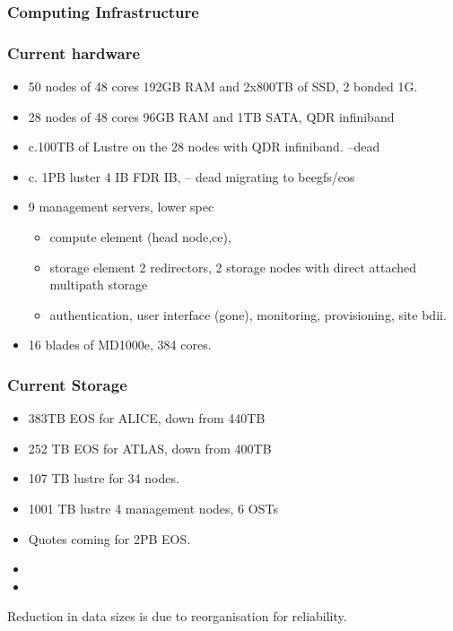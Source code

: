 \documentclass{beamer}
\begin{document}
\begin{frame}
  \frametitle{Computing Infrastructure}
\end{frame}

\begin{frame}
  \frametitle{Current hardware}
  \begin{itemize}
    \item 50 nodes of 48 cores 192GB RAM and 2x800TB of SSD, 2 bonded 1G.
    \item 28 nodes of 48 cores 96GB RAM and 1TB SATA, QDR infiniband
    \item c.100TB of Lustre on the 28 nodes with QDR infiniband. --dead
    \item c. 1PB luster 4 IB FDR IB, -- dead migrating to beegfs/eos
    \item 9 management servers, lower spec
  \begin{itemize}
    \item compute element (head node,ce),
    \item storage element 2 redirectors, 2 storage nodes with direct attached multipath storage
    \item authentication, user interface (gone), monitoring, provisioning, site bdii.
  \end{itemize} 
    \item 16 blades of MD1000e, 384 cores. \color{red}{\bf IB connection}
  \end{itemize}
\end{frame}

\begin{frame}
  \frametitle{Current Storage}
  \begin{itemize}
    \item 383TB EOS for ALICE, down from 440TB
    \item 252 TB EOS for ATLAS, down from 400TB
    \item 107 TB lustre for 34 nodes.
    \item 1001 TB lustre 4 management nodes, 6 OSTs
    \item Quotes coming for 2PB EOS.
    \item \color{red}{400TB ALICE}
    \item \color{red}{400TB ATLAS}
  \end{itemize}
Reduction in data sizes is due to reorganisation for reliability.
\end{frame}
\end{document}
